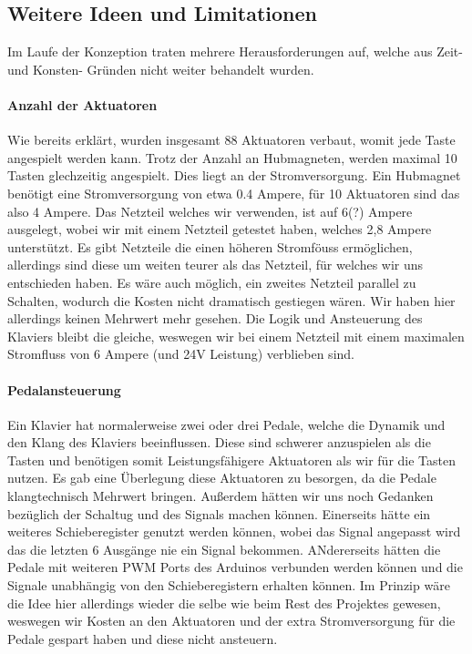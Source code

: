 \subsection{Weitere Ideen und Limitationen}

Im Laufe der Konzeption traten mehrere Herausforderungen auf, welche aus Zeit- und Konsten- Gründen nicht weiter
behandelt wurden.
\paragraph{Anzahl der Aktuatoren}
Wie bereits erklärt, wurden insgesamt 88 Aktuatoren verbaut, womit jede Taste angespielt werden kann. Trotz der Anzahl an
Hubmagneten, werden maximal 10 Tasten glechzeitig angespielt. Dies liegt an der Stromversorgung. Ein Hubmagnet benötigt
eine Stromversorgung von etwa 0.4 Ampere, für 10 Aktuatoren sind das also 4 Ampere. Das Netzteil welches wir verwenden, ist auf
6(?) Ampere ausgelegt, wobei wir mit einem Netzteil getestet haben, welches 2,8 Ampere unterstützt. Es gibt Netzteile die
einen höheren Stromföuss ermöglichen, allerdings sind diese um weiten teurer als das Netzteil, für welches wir uns entschieden haben.
Es wäre auch möglich, ein zweites Netzteil parallel zu Schalten, wodurch die Kosten nicht dramatisch gestiegen wären.
Wir haben hier allerdings keinen Mehrwert mehr gesehen. Die Logik und Ansteuerung des Klaviers bleibt die gleiche, weswegen
wir bei einem Netzteil mit einem maximalen Stromfluss von 6 Ampere (und 24V Leistung) verblieben sind.

\paragraph{Pedalansteuerung}
Ein Klavier hat normalerweise zwei oder drei Pedale, welche die Dynamik und den Klang des Klaviers beeinflussen.
Diese sind schwerer anzuspielen als die Tasten und benötigen somit Leistungsfähigere Aktuatoren als wir für die Tasten nutzen.
Es gab eine Überlegung diese Aktuatoren zu besorgen, da die Pedale klangtechnisch Mehrwert bringen.
Außerdem hätten wir uns noch Gedanken bezüglich der Schaltug und des Signals machen können.
Einerseits hätte ein weiteres Schieberegister genutzt werden können, wobei das Signal angepasst wird das die letzten 6 Ausgänge nie ein Signal bekommen.
ANdererseits hätten die Pedale mit weiteren PWM Ports des Arduinos verbunden werden können und die Signale unabhängig von den
Schieberegistern erhalten können.
Im Prinzip wäre die Idee hier allerdings wieder die selbe wie beim Rest des Projektes gewesen,
weswegen wir Kosten an den Aktuatoren und der extra Stromversorgung für die Pedale gespart haben und diese nicht ansteuern.

